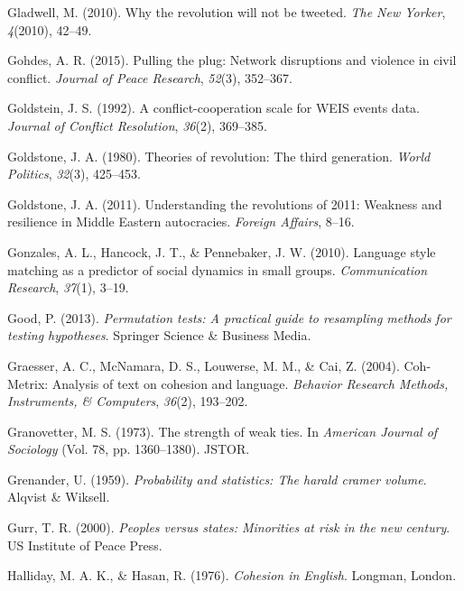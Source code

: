 \documentclass[english,man]{apa6}
\begin{document}
\leavevmode\hypertarget{ref-gladwell2010revolution}{}%
Gladwell, M. (2010). Why the revolution will not be tweeted. \emph{The New Yorker}, \emph{4}(2010), 42--49.

\leavevmode\hypertarget{ref-gohdes2015pulling}{}%
Gohdes, A. R. (2015). Pulling the plug: Network disruptions and violence in civil conflict. \emph{Journal of Peace Research}, \emph{52}(3), 352--367.

\leavevmode\hypertarget{ref-goldstein1992conflict}{}%
Goldstein, J. S. (1992). A conflict-cooperation scale for WEIS events data. \emph{Journal of Conflict Resolution}, \emph{36}(2), 369--385.

\leavevmode\hypertarget{ref-goldstone1980theories}{}%
Goldstone, J. A. (1980). Theories of revolution: The third generation. \emph{World Politics}, \emph{32}(3), 425--453.

\leavevmode\hypertarget{ref-goldstone2011understanding}{}%
Goldstone, J. A. (2011). Understanding the revolutions of 2011: Weakness and resilience in Middle Eastern autocracies. \emph{Foreign Affairs}, 8--16.

\leavevmode\hypertarget{ref-gonzales2010language}{}%
Gonzales, A. L., Hancock, J. T., \& Pennebaker, J. W. (2010). Language style matching as a predictor of social dynamics in small groups. \emph{Communication Research}, \emph{37}(1), 3--19.

\leavevmode\hypertarget{ref-good2013permutation}{}%
Good, P. (2013). \emph{Permutation tests: A practical guide to resampling methods for testing hypotheses}. Springer Science \& Business Media.

\leavevmode\hypertarget{ref-graesser2004coh}{}%
Graesser, A. C., McNamara, D. S., Louwerse, M. M., \& Cai, Z. (2004). Coh-Metrix: Analysis of text on cohesion and language. \emph{Behavior Research Methods, Instruments, \& Computers}, \emph{36}(2), 193--202.

\leavevmode\hypertarget{ref-granovetter1977strength}{}%
Granovetter, M. S. (1973). The strength of weak ties. In \emph{American Journal of Sociology} (Vol. 78, pp. 1360--1380). JSTOR.

\leavevmode\hypertarget{ref-grenander1959probability}{}%
Grenander, U. (1959). \emph{Probability and statistics: The harald cramer volume}. Alqvist \& Wiksell.

\leavevmode\hypertarget{ref-gurr2000peoples}{}%
Gurr, T. R. (2000). \emph{Peoples versus states: Minorities at risk in the new century}. US Institute of Peace Press.

\leavevmode\hypertarget{ref-halliday1976cohesion}{}%
Halliday, M. A. K., \& Hasan, R. (1976). \emph{Cohesion in English}. Longman, London.
\end{document}

